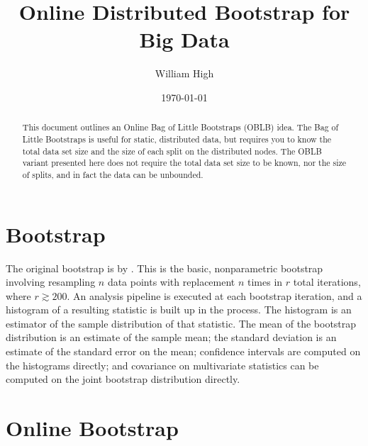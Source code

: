 \documentclass{article}
\begin{document}
%

\title{Online Distributed Bootstrap for Big Data}
\author{William High}
\date{\today}
\maketitle

\begin{abstract}

This document outlines an Online Bag of Little Bootstraps (OBLB) idea. The Bag
of Little Bootstraps is useful for static, distributed data, but requires you
to know the total data set size and the size of each split on the distributed
nodes. The OBLB variant presented here does not require the total data set
size to be known, nor the size of splits, and in fact the data can be
unbounded.

\end{abstract}

\section{Bootstrap}

The original bootstrap is by \cite{bib:efron}. This is the basic,
nonparametric bootstrap involving resampling $n$ data points with replacement
$n$ times in $r$ total iterations, where $r \gtrsim 200$. An analysis pipeline
is executed at each bootstrap iteration, and a histogram of a resulting
statistic is built up in the process. The histogram is an estimator of the
sample distribution of that statistic. The mean of the bootstrap distribution
is an estimate of the sample mean; the standard deviation is an estimate of
the standard error on the mean; confidence intervals are computed on the
histograms directly; and covariance on multivariate statistics can be computed
on the joint bootstrap distribution directly.

\section{Online Bootstrap}
\end{document}
